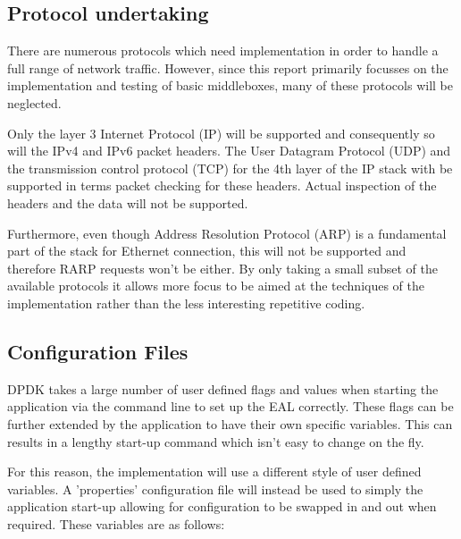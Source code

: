 \documentclass[final_report.tex]{subfiles}
\begin{document}

\subsection{Protocol undertaking}
There are numerous protocols which need implementation in order to handle a full range of network traffic. However, since this report primarily focusses on the implementation and testing of basic middleboxes, many of these protocols will be neglected.

Only the layer 3 Internet Protocol (IP) will be supported and consequently so will the IPv4 and IPv6 packet headers. The User Datagram Protocol (UDP) and the transmission control protocol (TCP) for the 4th layer of the IP stack with be supported in terms packet checking for these headers. Actual inspection of the headers and the data will not be supported.

Furthermore, even though Address Resolution Protocol (ARP) is a fundamental part of the stack for Ethernet connection, this will not be supported and therefore RARP requests won't be either. By only taking a small subset of the available protocols it allows more focus to be aimed at the techniques of the implementation rather than the less interesting repetitive coding.

\subsection{Configuration Files}
DPDK takes a large number of user defined flags and values when starting the application via the command line to set up the EAL correctly. These flags can be further extended by the application to have their own specific variables. This can results in a lengthy start-up command which isn't easy to change on the fly.

For this reason, the implementation will use a different style of user defined variables. A 'properties' configuration file will instead be used to simply the application start-up allowing for configuration to be swapped in and out when required. These variables are as follows:
\end{document}
